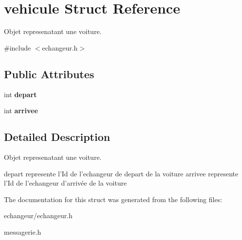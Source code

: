 \hypertarget{structvehicule}{\section{vehicule Struct Reference}
\label{structvehicule}
}


Objet represenatant une voiture.  




{\ttfamily \#include $<$echangeur.\-h$>$}

\subsection*{Public Attributes}
\begin{DoxyCompactItemize}
\item 
\hypertarget{structvehicule_a17c3b85ca7c9e2f69cc97edd708346c5}{int {\bfseries depart}}\label{structvehicule_a17c3b85ca7c9e2f69cc97edd708346c5}

\item 
\hypertarget{structvehicule_a6ff3845c2fb6d9d6d3be5e3c5e070518}{int {\bfseries arrivee}}\label{structvehicule_a6ff3845c2fb6d9d6d3be5e3c5e070518}

\end{DoxyCompactItemize}


\subsection{Detailed Description}
Objet represenatant une voiture. 

depart represente l'Id de l'echangeur de depart de la voiture arrivee represente l'Id de l'echangeur d'arrivée de la voiture 

The documentation for this struct was generated from the following files\-:\begin{DoxyCompactItemize}
\item 
echangeur/echangeur.\-h\item 
messagerie.\-h\end{DoxyCompactItemize}
